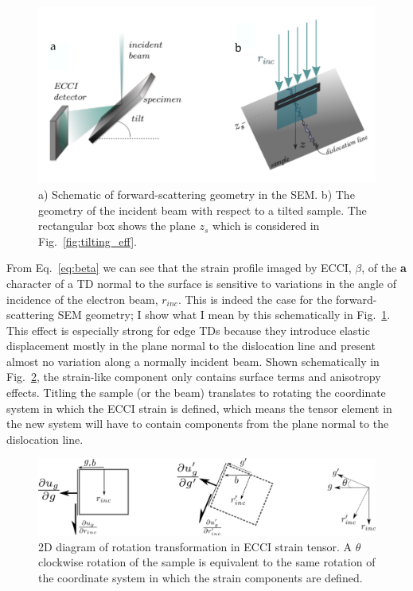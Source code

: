 \begin{figure}[ht]
    \centering
    \includegraphics[width=0.8\linewidth]{Figures/forward_geom.png}
    \caption[Forward-scattering geometry.]{a) Schematic of forward-scattering geometry in the SEM. b) The geometry of the incident beam with respect to a tilted sample. The rectangular box shows the plane $z_s$ which is considered in Fig.~\ref{fig:tilting_eff}.  }
    \label{fig:tilt}
\end{figure}

From Eq.~\ref{eq:beta} we can see that the strain profile imaged by ECCI, $\beta$,  of the \textbf{a} character of a TD normal to the surface is sensitive to variations in the angle of incidence of the electron beam, $r_{inc}$. This is indeed the case for the forward-scattering SEM geometry; I show what I mean by this schematically in Fig.~\ref{fig:tilt}. This effect is especially strong for edge TDs because they introduce elastic displacement mostly in the plane normal to the dislocation line and present almost no variation along a normally incident beam. Shown schematically in Fig.~\ref{fig:tilting}, the strain-like component only contains surface terms and anisotropy effects. Titling the sample (or the beam) translates to rotating the coordinate system in which the ECCI strain is defined, which means the tensor element in the new system will have to contain components from the plane normal to the dislocation line.

\begin{figure}[ht]
    \centering
    \includegraphics[width=0.9\linewidth]{Figures/tilting.png}
    \caption[Rotation transformation of sample tilting.]{2D diagram of rotation transformation in ECCI strain tensor. A $\theta$ clockwise rotation of the sample is equivalent to the same rotation of the coordinate system in which the strain components are defined. }
    \label{fig:tilting}
\end{figure}


